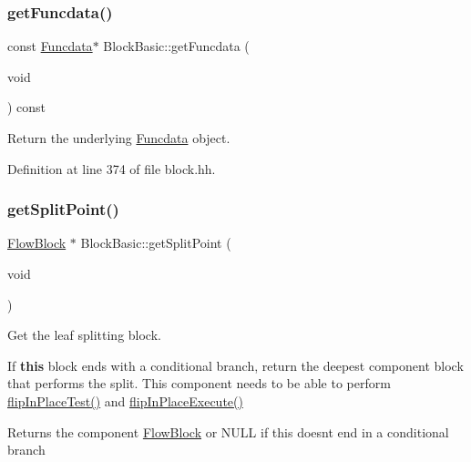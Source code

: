 \subsubsection{\texorpdfstring{getFuncdata()}{getFuncdata()}\hspace{0.1cm}{\footnotesize\ttfamily [2/2]}}
{\footnotesize\ttfamily const \mbox{\hyperlink{class_funcdata}{Funcdata}}$\ast$ Block\+Basic\+::get\+Funcdata (\begin{DoxyParamCaption}\item[{void}]{ }\end{DoxyParamCaption}) const\hspace{0.3cm}{\ttfamily [inline]}}



Return the underlying \mbox{\hyperlink{class_funcdata}{Funcdata}} object. 



Definition at line 374 of file block.\+hh.

\mbox{\label{class_block_basic_a22d7b010455f00b1bb1ff5efb3d00550}} 
\subsubsection{\texorpdfstring{getSplitPoint()}{getSplitPoint()}}
{\footnotesize\ttfamily \mbox{\hyperlink{class_flow_block}{Flow\+Block}} $\ast$ Block\+Basic\+::get\+Split\+Point (\begin{DoxyParamCaption}\item[{void}]{ }\end{DoxyParamCaption})\hspace{0.3cm}{\ttfamily [virtual]}}



Get the leaf splitting block. 

If {\bfseries{this}} block ends with a conditional branch, return the deepest component block that performs the split. This component needs to be able to perform \mbox{\hyperlink{class_block_basic_a7f864c14ab60a19ffb492b86f98f29c7}{flip\+In\+Place\+Test()}} and \mbox{\hyperlink{class_block_basic_a2949ef4a8d42f16c696fd24ba2ecb58c}{flip\+In\+Place\+Execute()}} \begin{DoxyReturn}{Returns}
the component \mbox{\hyperlink{class_flow_block}{Flow\+Block}} or N\+U\+LL if this doesn\textquotesingle{}t end in a conditional branch 
\end{DoxyReturn}


